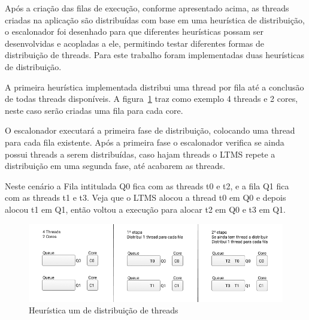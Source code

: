 \documentclass[diss,capa]{texufpel}
\begin{document}



Após a criação das filas de execução, conforme apresentado acima, as threads criadas na aplicação são distribuídas com base em uma heurística de distribuição, o escalonador foi desenhado para que diferentes heurísticas possam ser desenvolvidas e acopladas a ele, permitindo testar diferentes formas de distribuição de threads. Para este trabalho foram implementadas duas heurísticas de distribuição.

A primeira heurística implementada distribui uma thread por fila até a conclusão de todas threads disponíveis. A figura~\ref{queue_one} traz como exemplo 4 threads e 2 cores, neste caso serão criadas uma fila para cada core.

O escalonador executará a primeira fase de distribuição, colocando uma thread para cada fila existente. Após a primeira fase o escalonador verifica se ainda possui threads a serem distribuídas, caso hajam threads o LTMS repete a distribuição em uma segunda fase, até acabarem as threads.

Neste cenário a Fila intitulada Q0 fica com as threads t0 e t2, e a fila Q1 fica com as threads t1 e t3. Veja que o LTMS alocou a thread t0 em Q0 e depois alocou t1 em Q1, então voltou a execução para alocar t2 em Q0 e t3 em Q1.

\begin{figure}[htbp]
  \centering
  \includegraphics[scale=.6]{images/Queue_one.png}
\caption{Heurística um de distribuição de threads}
\label{queue_one}
\end{figure}
\end{document}
